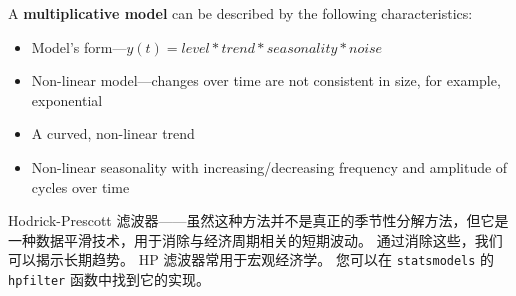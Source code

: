 A \textbf{multiplicative model} can be described by the following characteristics:
\begin{itemize}
    \item Model's form—$y(t) = level * trend * seasonality * noise$
    \item Non-linear model—changes over time are not consistent in size, for example, exponential
    \item A curved, non-linear trend
    \item Non-linear seasonality with increasing/decreasing frequency and amplitude of cycles over time
\end{itemize}

Hodrick-Prescott 滤波器——虽然这种方法并不是真正的季节性分解方法，但它是一种数据平滑技术，用于消除与经济周期相关的短期波动。 通过消除这些，我们可以揭示长期趋势。 HP 滤波器常用于宏观经济学。 您可以在 \verb|statsmodels| 的 \verb|hpfilter| 函数中找到它的实现。

